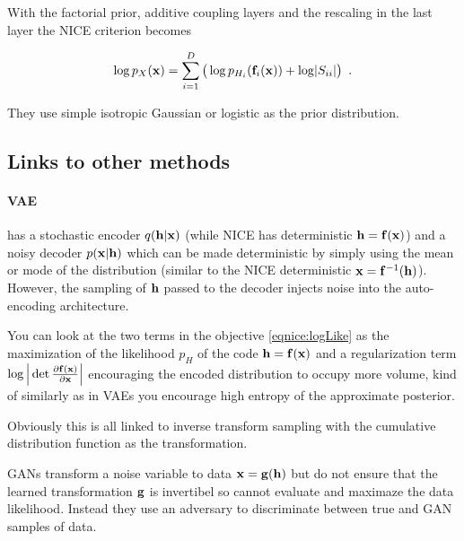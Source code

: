 With the factorial prior, additive coupling layers and the rescaling in the last layer the NICE criterion becomes

\begin{equation}\label{eqnice:niceObjective}
\log p_X(\mathbf{x}) = \sum_{i=1}^D \big( \log p_{H_i}(\mathbf{f}_i(\mathbf{x})) + \log \lvert S_{ii} \rvert \big) \enspace .
\end{equation}

They use simple isotropic Gaussian or logistic as the prior distribution.

\subsection{Links to other methods}

\paragraph{VAE} has a stochastic encoder $q(\mathbf{h} | \mathbf{x})$ (while NICE has deterministic $\mathbf{h} = \mathbf{f}(\mathbf{x})$) and a noisy decoder $p(\mathbf{x} | \mathbf{h})$ which can be made deterministic by simply using the mean or mode of the distribution (similar to the NICE deterministic $\mathbf{x} = \mathbf{f}^{-1}(\mathbf{h})$).
However, the sampling of $\mathbf{h}$ passed to the decoder injects noise into the auto-encoding architecture.

You can look at the two terms in the objective \eqref{eqnice:logLike} as the maximization of the likelihood $p_H$ of the code $\mathbf{h} = \mathbf{f}(\mathbf{x})$ and a regularization term $\log \Big\lvert \det \frac{\partial \mathbf{f}(\mathbf{x})}{\partial \mathbf{x}} \Big\rvert$ encouraging the encoded distribution to occupy more volume, kind of similarly as in VAEs you encourage high entropy of the approximate posterior.

Obviously this is all linked to inverse transform sampling with the cumulative distribution function as the transformation.

GANs transform a noise variable to data $\mathbf{x} = \mathbf{g}(\mathbf{h})$ but do not ensure that the learned transformation $\mathbf{g}$ is invertibel so cannot evaluate and maximaze the data likelihood. Instead they use an adversary to discriminate between true and GAN samples of data.




